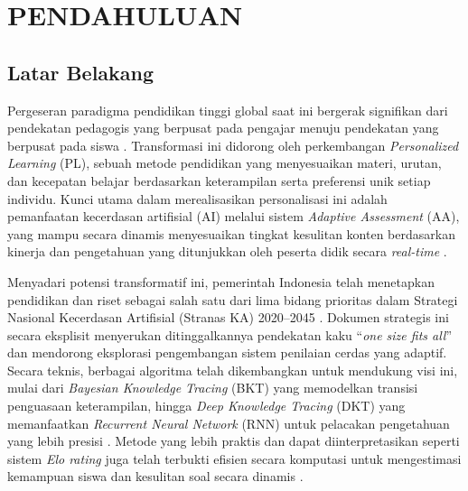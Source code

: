 \chapter{PENDAHULUAN}
\label{chap:pendahuluan}
\section{Latar Belakang}
\label{sec:latar_belakang}

Pergeseran paradigma pendidikan tinggi global saat ini bergerak signifikan dari
pendekatan pedagogis yang berpusat pada pengajar menuju pendekatan yang berpusat
pada siswa \autocite{Ryoo2021}. Transformasi ini didorong oleh perkembangan
\textit{Personalized Learning} (PL), sebuah metode pendidikan yang menyesuaikan
materi, urutan, dan kecepatan belajar berdasarkan keterampilan serta preferensi
unik setiap individu. Kunci utama dalam merealisasikan personalisasi ini adalah
pemanfaatan kecerdasan artifisial (AI) melalui sistem \textit{Adaptive
Assessment} (AA), yang mampu secara dinamis menyesuaikan tingkat kesulitan konten
berdasarkan kinerja dan pengetahuan yang ditunjukkan oleh peserta didik secara
\textit{real-time} \autocite{Halkiopoulos2024}.

Menyadari potensi transformatif ini, pemerintah Indonesia telah menetapkan
pendidikan dan riset sebagai salah satu dari lima bidang prioritas dalam Strategi
Nasional Kecerdasan Artifisial (Stranas KA) 2020--2045 \autocite{BPPT2020}.
Dokumen strategis ini secara eksplisit menyerukan ditinggalkannya pendekatan
kaku ``\textit{one size fits all}'' dan mendorong eksplorasi pengembangan sistem
penilaian cerdas yang adaptif. Secara teknis, berbagai algoritma telah
dikembangkan untuk mendukung visi ini, mulai dari \textit{Bayesian Knowledge
Tracing} (BKT) yang memodelkan transisi penguasaan keterampilan, hingga
\textit{Deep Knowledge Tracing} (DKT) yang memanfaatkan \textit{Recurrent Neural
Network} (RNN) untuk pelacakan pengetahuan yang lebih presisi \autocite{Minn2022}.
Metode yang lebih praktis dan dapat diinterpretasikan seperti sistem
\textit{Elo rating} juga telah terbukti efisien secara komputasi untuk
mengestimasi kemampuan siswa dan kesulitan soal secara dinamis
\autocite{Vesin2022}.

